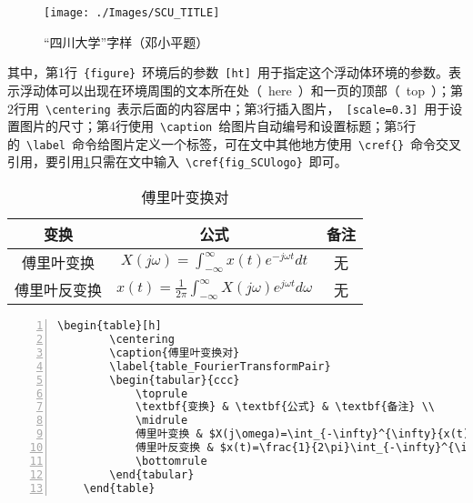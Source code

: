 \begin{figure}[h]
	\centering
	\texttt{[image: ./Images/SCU\_TITLE]}
	\caption{“四川大学”字样（邓小平题）}
	\label{fig_SCUlogo}
\end{figure}


其中，第1行~\verb|{figure}|~环境后的参数~\verb|[ht]|~用于指定这个浮动体环境的参数。表示浮动体可以出现在环境周围的文本所在处（~here~）和一页的顶部（~top~）；第2行用~\verb|\centering|~表示后面的内容居中；第3行插入图片，~\verb|[scale=0.3]|~用于设置图片的尺寸；第4行使用~\verb|\caption|~给图片自动编号和设置标题；第5行的~\verb|\label|~命令给图片定义一个标签\cite{Book_LaTeXIntro}，可在文中其他地方使用~\verb|\cref{}|~命令交叉引用，要引用\cref{fig_SCUlogo}只需在文中输入~\verb|\cref{fig_SCUlogo}|~即可。

\begin{table}[h]
	\centering
	\caption{傅里叶变换对}
	\label{table_FourierTransformPair}
	\begin{tabular}{ccc}
		\toprule
		\textbf{变换}    & \textbf{公式}                                                              & \textbf{备注} \\
		\midrule
		傅里叶变换    & $X(j\omega)=\int_{-\infty}^{\infty}{x(t)e^{-j\omega t}}dt$                   & 无             \\
		傅里叶反变换 & $x(t)=\frac{1}{2\pi}\int_{-\infty}^{\infty}{X(j\omega)e^{j\omega t}}d\omega$ & 无             \\
		\bottomrule
	\end{tabular}
\end{table}


\begin{Verbatim}[gobble=1,frame=single,numbers=left]
	\begin{table}[h]
		\centering
		\caption{傅里叶变换对}
		\label{table_FourierTransformPair}
		\begin{tabular}{ccc}
			\toprule
			\textbf{变换} & \textbf{公式} & \textbf{备注} \\
			\midrule
			傅里叶变换 & $X(j\omega)=\int_{-\infty}^{\infty}{x(t)e^{-j\omega t}}dt$ & 无 \\
			傅里叶反变换 & $x(t)=\frac{1}{2\pi}\int_{-\infty}^{\infty}{X(j\omega)e^{j\omega t}}d\omega$ & 无 \\
			\bottomrule
		\end{tabular}
	\end{table}
\end{Verbatim}


